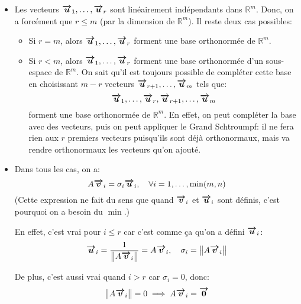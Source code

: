 \documentclass[a4paper]{article}
\begin{document}
{\begin{itemize}[left=0pt]
              On a donc:
              \[A \bvec{v}_1 = \sigma_1 \bvec{u}_1, \mathspace \ldots, \mathspace A \bvec{v}_r = \sigma_r \bvec{u}_r\]

              Les vecteurs $\bvec{u}_1, \ldots, \bvec{u}_r$ sont orthonormés dans $\mathbb{R}^m$ car ils sont orthogonaux (on a démontré que $\left(A \bvec{v}_i\right) \dotprod \left(A \bvec{v}_j\right) = 0$ quand $i \neq j$) et car ils sont de norme égale à 1.
        \item Les vecteurs $\bvec{u}_1, \ldots, \bvec{u}_r$ sont linéairement indépendants dans $\mathbb{R}^m$. Donc, on a forcément que $r \leq m$ (par la dimension de $\mathbb{R}^m$). Il reste deux cas possibles:
              \begin{itemize}
                  \item Si $r = m$, alors $\bvec{u}_1, \ldots, \bvec{u}_r$ forment une base orthonormée de $\mathbb{R}^m$.
                  \item Si $r < m$, alors $\bvec{u}_1, \ldots, \bvec{u}_r$ forment une base orthonormée d'un sous-espace de $\mathbb{R}^m$. On sait qu'il est toujours possible de compléter cette base en choisissant $m - r$ vecteurs $\bm{\protect\overrightarrow{u}}_{r+1}, \ldots, \bm{\protect\overrightarrow{u}}_m$ tels que:
                        \[\bm{\protect\overrightarrow{u}}_1, \ldots, \bm{\protect\overrightarrow{u}}_r, \bm{\protect\overrightarrow{u}}_{r+1}, \ldots, \bm{\protect\overrightarrow{u}}_m\]
                        forment une base orthonormée de $\mathbb{R}^m$. En effet, on peut compléter la base avec des vecteurs, puis on peut appliquer le Grand Schtroumpf: il ne fera rien aux $r$ premiers vecteurs puisqu'ils sont déjà orthonormaux, mais va rendre orthonormaux les vecteurs qu'on ajouté.
              \end{itemize}

        \item Dans tous les cas, on a:
              \[A \bvec{v}_i = \sigma_i \bvec{u}_i, \mathspace \forall i = 1, \ldots, \min\left(m, n\right)\]
              (Cette expression ne fait du sens que quand $\bm{\protect\overrightarrow{v}}_i$ et $\bm{\protect\overrightarrow{u}}_i$ sont définis, c'est pourquoi on a besoin du $\min$.)

              En effet, c'est vrai pour $i \leq r$ car c'est comme ça qu'on a défini $\bm{\protect\overrightarrow{u}}_i$:
              \[\bvec{u}_i = \frac{1}{\left\|A \bvec{v}_i\right\|} = A \bvec{v}_i, \mathspace \sigma_i = \left\| A \bvec{v}_i\right\|\]

              De plus, c'est aussi vrai quand $i > r$ car $\sigma_i = 0$, donc:
              \[\left\|A \bvec{v}_i\right\| = 0 \implies A \bvec{v}_i = \bvec{0}\]



\end{itemize}}
\end{document}
